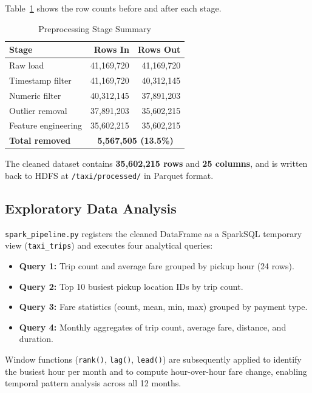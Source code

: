 \documentclass[conference]{IEEEtran}
\begin{document}
Table~\ref{tab:clean} shows the row counts before and after each
stage.

\begin{table}[h]
\caption{Preprocessing Stage Summary}
\label{tab:clean}
\centering
\begin{tabular}{lrr}
\toprule
\textbf{Stage} & \textbf{Rows In} & \textbf{Rows Out} \\
\midrule
Raw load              & 41,169,720 & 41,169,720 \\
Timestamp filter      & 41,169,720 & 40,312,145 \\
Numeric filter        & 40,312,145 & 37,891,203 \\
Outlier removal       & 37,891,203 & 35,602,215 \\
Feature engineering   & 35,602,215 & 35,602,215 \\
\midrule
\textbf{Total removed} & \multicolumn{2}{c}{\textbf{5,567,505 (13.5\%)}} \\
\bottomrule
\end{tabular}
\end{table}

The cleaned dataset contains \textbf{35,602,215 rows} and
\textbf{25 columns}, and is written back to HDFS at
\texttt{/taxi/processed/} in Parquet format.

\subsection{Exploratory Data Analysis}

\texttt{spark\_pipeline.py} registers the cleaned DataFrame as a
SparkSQL temporary view (\texttt{taxi\_trips}) and executes four
analytical queries:

\begin{itemize}
  \item \textbf{Query 1:} Trip count and average fare grouped by
        pickup hour (24 rows).
  \item \textbf{Query 2:} Top 10 busiest pickup location IDs by
        trip count.
  \item \textbf{Query 3:} Fare statistics (count, mean, min, max)
        grouped by payment type.
  \item \textbf{Query 4:} Monthly aggregates of trip count, average
        fare, distance, and duration.
\end{itemize}

Window functions (\texttt{rank()}, \texttt{lag()}, \texttt{lead()})
are subsequently applied to identify the busiest hour per month and
to compute hour-over-hour fare change, enabling temporal pattern
analysis across all 12 months.
\end{document}
